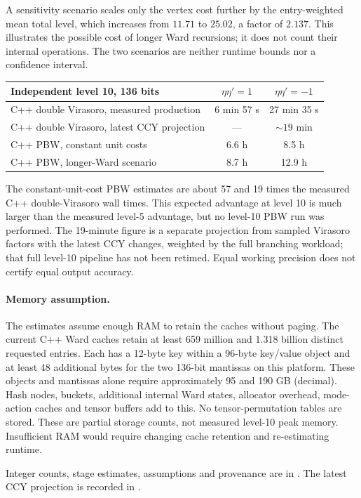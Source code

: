A sensitivity scenario scales only the vertex cost further by the
entry-weighted mean total level, which increases from $11.71$ to
$25.02$, a factor of $2.137$. This illustrates the possible cost of
longer Ward recursions; it does not count their internal operations.
The two scenarios are neither runtime bounds nor a confidence interval.
\begin{center}\small
\begin{tabular}{@{}lcc@{}}
\toprule
Independent level 10, 136 bits & $\eta\eta'=1$ & $\eta\eta'=-1$\\
\midrule
C++ double Virasoro, measured production & 6 min 57 s & 27 min 35 s\\
C++ double Virasoro, latest CCY projection & --- & $\sim19$ min\\
C++ PBW, constant unit costs & 6.6 h & 8.5 h\\
C++ PBW, longer-Ward scenario & 8.7 h & 12.9 h\\
\bottomrule
\end{tabular}
\end{center}
The constant-unit-cost PBW estimates are about 57 and 19
times the measured C++ double-Virasoro wall times. This expected
advantage at level 10 is much larger than the measured level-5 advantage,
but no level-10 PBW run was performed. The 19-minute figure is a separate
projection from sampled Virasoro factors with the latest CCY changes,
weighted by the full branching workload; that full level-10 pipeline has
not been retimed. Equal working precision does not certify equal output accuracy.

\paragraph{Memory assumption.}
The estimates assume enough RAM to retain the caches without paging.
The current C++ Ward caches retain at least 659 million and 1.318 billion
distinct requested entries. Each has a 12-byte key within a 96-byte
key/value object and at least 48 additional bytes for the two 136-bit
mantissas on this platform. These objects and mantissas alone require
approximately 95 and 190 GB (decimal). Hash nodes, buckets,
additional internal Ward states, allocator overhead, mode-action caches
and tensor buffers add to this. No tensor-permutation tables are stored.
These are partial storage counts, not measured level-10 peak memory.
Insufficient RAM would require changing cache retention and re-estimating runtime.

\begingroup\raggedright
Integer counts, stage estimates, assumptions and provenance are in
.
The latest CCY projection is recorded in
.
\par\endgroup
